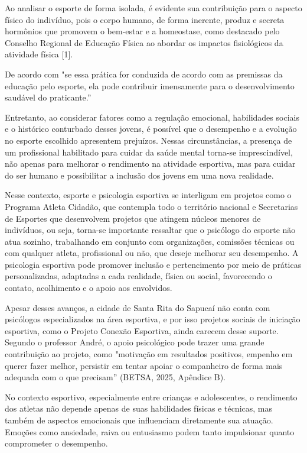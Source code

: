 \begin{Desenvolvimento}
Ao analisar o esporte de forma isolada, é evidente sua contribuição para o aspecto físico do indivíduo, pois o corpo humano, de forma inerente, produz e secreta hormônios que promovem o bem-estar e a homeostase, como destacado pelo Conselho Regional de Educação Física ao abordar os impactos fisiológicos da atividade física [1].

De acordo com "se essa prática for conduzida de acordo com as premissas da educação pelo esporte, ela pode contribuir imensamente para o desenvolvimento saudável do praticante.”

Entretanto, ao considerar fatores como a regulação emocional, habilidades sociais e o histórico conturbado desses jovens, é possível que o desempenho e a evolução no esporte escolhido apresentem prejuízos. Nessas circunstâncias, a presença de um profissional habilitado para cuidar da saúde mental torna-se imprescindível, não apenas para melhorar o rendimento na atividade esportiva, mas para cuidar do ser humano e possibilitar a inclusão dos jovens em uma nova realidade.

Nesse contexto, esporte e psicologia esportiva se interligam em projetos como o Programa Atleta Cidadão, que contempla todo o território nacional e Secretarias de Esportes que desenvolvem projetos que atingem núcleos menores de indivíduos, ou seja, torna-se importante  ressaltar que o psicólogo do esporte não atua sozinho, trabalhando em conjunto com organizações, comissões técnicas ou com qualquer atleta, profissional ou não, que deseje melhorar seu desempenho. A psicologia esportiva pode promover inclusão e pertencimento por meio de práticas personalizadas, adaptadas a cada realidade, física ou social, favorecendo o contato, acolhimento e o apoio aos envolvidos.

Apesar desses avanços, a cidade de Santa Rita do Sapucaí não conta com psicólogos especializados na área esportiva, e por isso projetos sociais de iniciação esportiva, como o Projeto Conexão Esportiva, ainda carecem desse suporte. Segundo o professor André, o apoio psicológico pode trazer uma grande contribuição ao projeto, como "motivação em resultados positivos, empenho em querer fazer melhor, persistir em tentar apoiar o companheiro de forma mais adequada com o que precisam” (BETSA, 2025, Apêndice B).

No contexto esportivo, especialmente entre crianças e adolescentes, o rendimento dos atletas não depende apenas de suas habilidades físicas e técnicas, mas também de aspectos emocionais que influenciam diretamente sua atuação. Emoções como ansiedade, raiva ou entusiasmo podem tanto impulsionar quanto comprometer o desempenho.


\end{Desenvolvimento}

